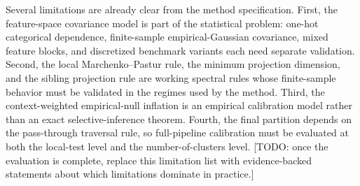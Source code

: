 Several limitations are already clear from the method specification. First, the
feature-space covariance model is part of the statistical problem: one-hot
categorical dependence, finite-sample empirical-Gaussian covariance, mixed
feature blocks, and discretized benchmark variants each need separate
validation. Second, the local Marchenko--Pastur rule, the minimum projection
dimension, and the sibling projection rule are working spectral rules whose
finite-sample behavior must be validated in the regimes used by the method.
Third, the context-weighted empirical-null inflation is an empirical calibration
model rather than an exact selective-inference theorem. Fourth, the final
partition depends on the pass-through traversal rule, so full-pipeline
calibration must be evaluated at both the local-test level and the
number-of-clusters level.
[TODO: once the evaluation is complete, replace this limitation list with
evidence-backed statements about which limitations dominate in practice.]
